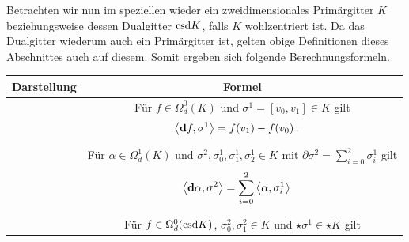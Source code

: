   \begin{bemerkung}
    Betrachten wir nun im speziellen wieder ein zweidimensionales Primärgitter \( K \) beziehungsweise dessen Dualgitter \( \text{csd} K \), 
    falls \( K \) wohlzentriert ist.
    Da das Dualgitter wiederum auch ein Primärgitter ist, gelten obige Definitionen dieses Abschnittes auch auf diesem. 
    Somit ergeben sich folgende Berechnungsformeln.\\
    \begin{tabular}{|c|c|} \hline
      Darstellung & Formel \\\hline
      \begin{minipage}[c]{0.29\textwidth}
        \centering
      \end{minipage} &
      \begin{minipage}[c]{0.69\textwidth}
        Für \( f\in\Omega_{d}^{0}(K) \) und \( \sigma^{1}=\left[ v_{0}, v_{1} \right]\in K \) gilt
        {\begin{align}
          \left\langle \mathbf{d} f , \sigma^{1} \right\rangle &= f(v_{1}) - f(v_{0}) \,\text{.}
        \end{align}}
      \end{minipage} \\\hline
      \begin{minipage}[c]{0.29\textwidth}
        \centering
      \end{minipage} &
      \begin{minipage}[c]{0.69\textwidth}
      Für \( \alpha\in\Omega_{d}^{1}(K) \) und \( \sigma^{2},\sigma^{1}_{0},\sigma^{1}_{1},\sigma^{1}_{2} \in K \) 
      mit \( \partial\sigma^{2} = \sum_{i=0}^{2} \sigma^{1}_{i} \) gilt
        {\begin{align}
          \left\langle \mathbf{d} \alpha , \sigma^{2} \right\rangle &= \sum_{i=0}^{2} \left\langle \alpha, \sigma_{i}^{1}\right\rangle
        \end{align}}
      \end{minipage} \\\hline
      \begin{minipage}[c]{0.29\textwidth}
        \centering
      \end{minipage} &
      \begin{minipage}[c]{0.69\textwidth}
        Für \( f\in\Omega_{d}^{0}(\text{csd} K) \), \( \sigma^{2}_{0}, \sigma^{2}_{1} \in K \) und 
        \( \star\sigma^{1} \in \star K \) gilt

\end{minipage}
\end{tabular}
\end{bemerkung}
